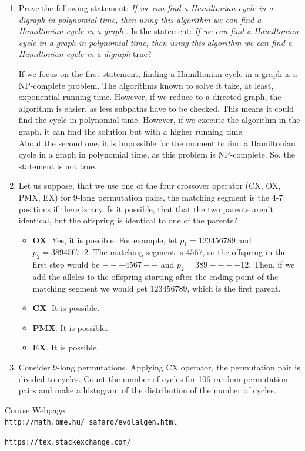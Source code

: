 \documentclass[12pt,english]{article}
\newenvironment{statement}{\fontfamily{ptm}\selectfont}{\par}
\begin{document}
\begin{enumerate}

	\item
		\begin{statement}
		Prove the following statement: \emph{If we can find a Hamiltonian cycle in a digraph in polynomial time, then using this algorithm we can find a Hamiltonian cycle in a graph.}.
		Is the statement: \emph{If we can find a Hamiltonian cycle in a graph in polynomial time, then using this algorithm we can find a Hamiltonian cycle in a digraph} true?
		\end{statement}

		If we focus on the first statement, finding a Hamiltonian cycle in a graph is a NP-complete problem. The algorithms known to solve it take, at least, exponential running time. However, if we reduce to a directed graph, the algorithm is easier, as less subpaths have to be checked. This means it could find the cycle in polynomial time. However, if we execute the algorithm in the graph, it can find the solution but with a higher running time.\\

		About the second one, it is impossible for the moment to find a Hamiltonian cycle in a graph in polynomial time, as this problem is NP-complete. So, the statement is not true.


	\item
		\begin{statement}
		Let us suppose, that we use one of the four crossover operator (CX, OX, PMX, EX) for 9-long permutation pairs, the matching segment is the 4-7 positions if there is any. Is it possible, that that the two parents aren’t identical, but the offspring is identical to one of the parents?
		\end{statement}

		\begin{itemize}
			\item \textbf{OX}. Yes, it is possible. For example, let $p_1=123456789$ and $p_2=389456712$. The matching segment is $4567$, so the offspring in the first step would be $---4567--$ and $p_2=389----12$. Then, if we add the alleles to the offspring starting after the ending point of the matching segment we would get $123456789$, which is the first parent.
			\item \textbf{CX}. It is possible.
			\item \textbf{PMX}. It is possible.
			\item \textbf{EX}. It is possible.
		\end{itemize}

	\item
		\begin{statement}
		Consider 9-long permutations. Applying CX operator, the permutation pair is divided to cycles. Count the number of cycles for 106 random permutation pairs and make a histogram of the distribution of the number of cycles.
		\end{statement}



\end{enumerate}


\begin{thebibliography}{9}

Course Webpage
\\\texttt{http://math.bme.hu/~safaro/evolalgen.html}


\texttt{https://tex.stackexchange.com/}


\end{thebibliography}
\end{document}
